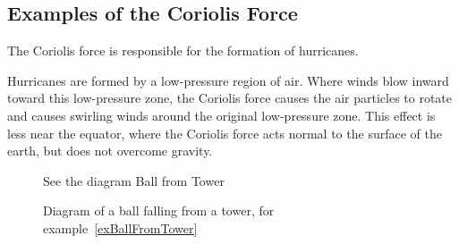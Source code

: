 \documentclass[../Main.tex]{subfiles}
\begin{document}
\subsection{Examples of the Coriolis Force}
\begin{example}[Hurricanes]
    The Coriolis force is responsible for the formation of hurricanes.\par
    Hurricanes are formed by a low-pressure region of air. Where winds blow inward toward this low-pressure zone, the Coriolis force causes the air particles to rotate and causes swirling winds around the original low-pressure zone. This effect is less near the equator, where the Coriolis force acts normal to the surface of the earth, but does not overcome gravity.
\end{example}
\begin{figure}[ht]
    \centering
    See the diagram Ball from Tower %
    
    \caption{Diagram of a ball falling from a tower, for example~\ref{exBallFromTower}}
    \label{figBallFromTower}
\end{figure}
\end{document}
